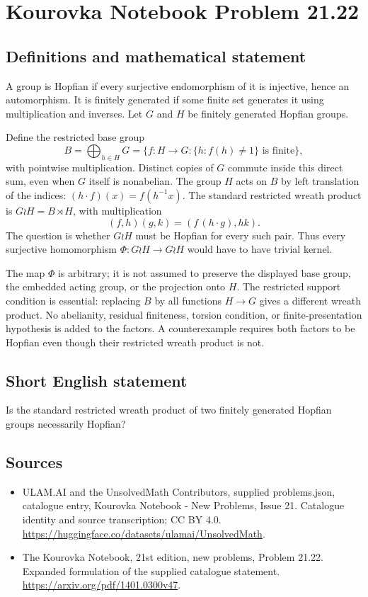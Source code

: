 \documentclass[11pt,a4paper]{article}
\begin{document}
\section*{Kourovka Notebook Problem 21.22}\label{statement}

\subsection{Definitions and mathematical statement}
A group is Hopfian if every surjective endomorphism of it is injective,
hence an automorphism. It is finitely generated if some finite set generates
it using multiplication and inverses.
Let $G$ and $H$ be finitely generated Hopfian groups.

Define the restricted base group
\[
 B=\bigoplus_{h\in H}G
   =\{f:H\to G:\{h:f(h)\ne1\}\text{ is finite}\},
\]
with pointwise multiplication. Distinct copies of $G$ commute inside
this direct sum, even when $G$ itself is nonabelian. The group $H$ acts
on $B$ by left translation of the indices:
$(h\cdot f)(x)=f(h^{-1}x)$. The standard restricted wreath product is
$G\wr H=B\rtimes H$, with multiplication
\[
 (f,h)(g,k)=(f\,(h\cdot g),hk).
\]
The question is whether $G\wr H$ must be Hopfian for every such pair.
Thus every surjective homomorphism $\Phi:G\wr H\to G\wr H$ would have
to have trivial kernel.

The map $\Phi$ is arbitrary; it is not assumed to preserve the displayed
base group, the embedded acting group, or the projection onto $H$.
The restricted support condition is essential: replacing $B$ by all
functions $H\to G$ gives a different wreath product. No abelianity,
residual finiteness, torsion condition, or finite-presentation hypothesis
is added to the factors. A counterexample requires both factors to be
Hopfian even though their restricted wreath product is not.
\subsection{Short English statement}
Is the standard restricted wreath product of two finitely generated Hopfian groups necessarily Hopfian?
\subsection{Sources}
\begin{itemize}
\item[S1] ULAM.AI and the UnsolvedMath Contributors, supplied problems.json, catalogue entry, Kourovka Notebook - New Problems, Issue 21. Catalogue identity and source transcription; CC BY 4.0.
\url{https://huggingface.co/datasets/ulamai/UnsolvedMath}.
\item[S2] The Kourovka Notebook, 21st edition, new problems, Problem 21.22. Expanded formulation of the supplied catalogue statement.
\url{https://arxiv.org/pdf/1401.0300v47}.
\end{itemize}
\end{document}
